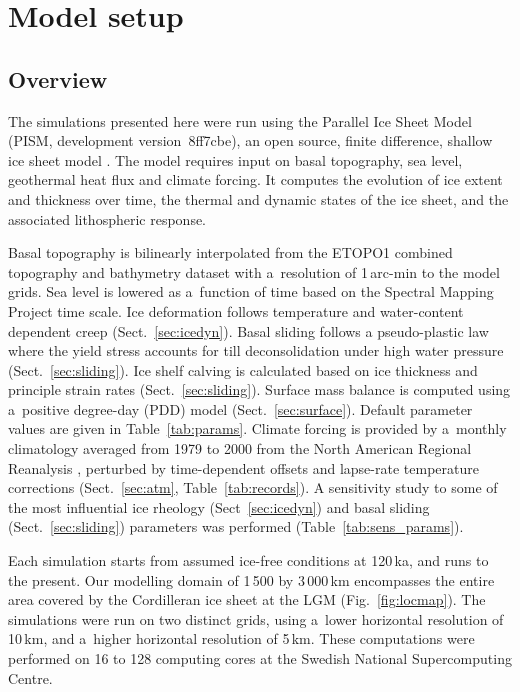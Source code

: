 \documentclass[tc, manuscript]{copernicus}
\begin{document}
\section{Model setup}
\label{sec:model}

\subsection{Overview}
\label{sec:overview}%

      The simulations presented here were run using the Parallel Ice Sheet
      Model (PISM, development version~8ff7cbe), an open source, finite
      difference, shallow ice sheet model \citep{PISM-authors.2015}. The
      model requires input on basal topography, sea level, geothermal heat
      flux and climate forcing. It computes the evolution of ice extent and
      thickness over time, the thermal and dynamic states of the ice sheet,
      and the associated lithospheric response.

      Basal topography is bilinearly interpolated from the ETOPO1 combined
      topography and bathymetry dataset with a~resolution of 1\,arc-min
      \citep{Amante.Eakins.2009} to the model grids. Sea level is lowered as
      a~function of time based on the Spectral Mapping Project
      \citep[SPECMAP,][]{Imbrie.etal.1989} time scale. Ice deformation
      follows temperature and water-content dependent creep
      (Sect.~\ref{sec:icedyn}). Basal sliding follows
      a pseudo-plastic law where the yield stress accounts for till
      deconsolidation under high water pressure (Sect.~\ref{sec:sliding}).
      Ice shelf calving is calculated based on ice thickness and principle
      strain rates (Sect.~\ref{sec:sliding}). Surface mass balance is
      computed using a~positive degree-day (PDD) model
      (Sect.~\ref{sec:surface}). Default parameter values are given in
      Table~\ref{tab:params}. Climate forcing is provided by a~monthly
      climatology averaged from 1979 to 2000 from the North American
      Regional Reanalysis \citep[NARR,][]{Mesinger.etal.2006}, perturbed
      by time-dependent offsets and lapse-rate temperature corrections
      (Sect.~\ref{sec:atm}, Table~\ref{tab:records}). A sensitivity study
      to some of the most influential ice rheology (Sect~\ref{sec:icedyn})
      and basal sliding (Sect.~\ref{sec:sliding}) parameters was performed
      (Table~\ref{tab:sens_params}).

      Each simulation starts from assumed ice-free conditions at
      120\,\unit{ka}, and runs to the present.
      Our modelling domain of 1\,500 by 3\,000\,\unit{km} encompasses
      the entire area covered by the Cordilleran ice sheet at the LGM
      (Fig.~\ref{fig:locmap}). The simulations were run on two distinct
      grids, using a~lower horizontal resolution of 10\,\unit{km}, and
      a~higher horizontal resolution of 5\,\unit{km}. These computations
      were performed on 16 to 128 computing cores at the Swedish National
      Supercomputing Centre.
\end{document}
